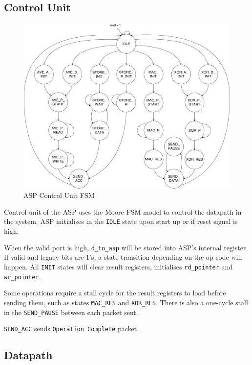 \documentclass[]{article}
\begin{document}
	\subsection{Control Unit}\label{header-c5}
	
	\begin{figure}[H]
		\centering
		\includegraphics[width = 5.5in]{asp_fsm}
		\caption{ASP Control Unit FSM}
		\label{fig:asp_fsm}
	\end{figure}
	
	Control unit of the ASP uses the Moore FSM model to control the datapath in the system. ASP initialises in the \texttt{IDLE} state upon start up or if reset signal is high. \par 
	
	When the valid port is high, \texttt{d\_to\_asp} will be stored into ASP's internal register. If valid and legacy bits are 1's, a state transition depending on the op code will happen. All \texttt{INIT} states will clear result registers, initialises \texttt{rd\_pointer} and \texttt{wr\_pointer}. \par 
	
	Some operations require a stall cycle for the result registers to load before sending them, such as states \texttt{MAC\_RES} and \texttt{XOR\_RES}. There is also a one-cycle stall in the \texttt{SEND\_PAUSE} between each packet sent.
	
	\texttt{SEND\_ACC} sends \texttt{Operation Complete} packet.
	
	\newpage
	\enlargethispage{2in}
	\subsection{Datapath}
	
\end{document}
